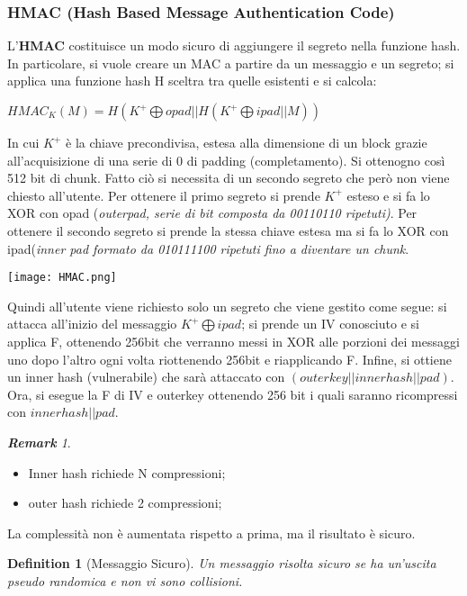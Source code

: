 \documentclass{article}
\newtheorem{definition}{Definition}[section]
\theoremstyle{remark}
\newtheorem*{remark}{\textbf{Remark}}
\begin{document}
\subsubsection{HMAC (Hash Based Message Authentication Code)}
L'\textbf{HMAC} costituisce un modo sicuro di aggiungere il segreto nella funzione hash. In particolare, si vuole creare un MAC a partire da un messaggio e un segreto; si applica una funzione hash H sceltra tra quelle esistenti e si calcola:
\begin{center}
	$HMAC_K(M)=H(K^{+}\bigoplus opad||H(K^{+} \bigoplus ipad ||M))$
\end{center}
In cui $K^{+}$ è la chiave precondivisa, estesa alla dimensione di un block grazie all'acquisizione di una serie di 0 di padding (completamento). Si ottenogno così 512 bit di chunk. Fatto ciò si necessita di un secondo segreto che però non viene chiesto all'utente.
Per ottenere il primo segreto si prende $K^{+}$ esteso e si fa lo XOR con opad (\emph{outerpad, serie di bit composta da 00110110 ripetuti)}.
Per ottenere il secondo segreto si prende la stessa chiave estesa ma si fa lo XOR con ipad(\emph{inner pad formato da 010111100 ripetuti fino a diventare un chunk}.
\begin{center}
	\texttt{[image: HMAC.png]}
\end{center}
Quindi all'utente viene richiesto solo un segreto che viene gestito come segue: si attacca all'inizio del messaggio $K^{+} \bigoplus ipad$; si prende un IV conosciuto e si applica F, ottenendo 256bit che verranno messi in XOR alle porzioni dei messaggi uno dopo l'altro ogni volta riottenendo 256bit e riapplicando F.
Infine, si ottiene un inner hash (vulnerabile) che sarà attaccato con $(outerkey||inner hash|| pad)$. Ora, si esegue la F di IV e outerkey ottenendo 256 bit i quali saranno ricompressi con $inner hash||pad$.
\begin{remark}
	\begin{itemize}
		\item Inner hash richiede N compressioni;
		\item outer hash richiede 2 compressioni;
	\end{itemize}
	La complessità non è aumentata rispetto a prima, ma il risultato è sicuro.
\end{remark}
\begin{definition}[Messaggio Sicuro]
	Un messaggio risolta sicuro se ha un'uscita pseudo randomica e non vi sono collisioni.
\end{definition}
\end{document}

